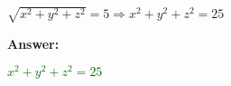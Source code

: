 \documentclass[10pt]{article}                               %
\begin{document}
\begin{adjustwidth}{2em}{0pt}
\begin{adjustwidth}{2em}{0pt}
\begin{examplebox}
\begin{adjustwidth}{2em}{0pt}
                    \vspace{0.25em}
            
                    \( \sqrt{x^2 + y^2 + z^2} = 5 \Rightarrow x^2 + y^2 + z^2 = 25 \)
            
                    \vspace{0.5em}
            
                    \textbf{Answer:}
            
                    \vspace{0.25em}
            
                    \textcolor{darkgreen}{\( x^2 + y^2 + z^2 = 25 \)}
            
                \end{adjustwidth}
            
            \end{examplebox}

    \end{adjustwidth}

\end{adjustwidth}
\end{document}
